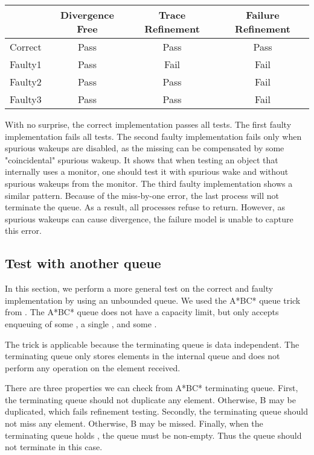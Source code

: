 \documentclass[a4paper, 12pt]{article}
\begin{document}
\begin{tabular}{|c | c | c | c|}
    \hline
    & Divergence Free & Trace Refinement & Failure Refinement \\ \hline
    Correct & Pass & Pass & Pass \\ \hline
    Faulty1 & Pass & Fail & Fail \\ \hline
    Faulty2 & Pass & Pass & Fail \\ \hline
    Faulty3 & Pass & Pass & Fail \\ \hline
\end{tabular}
\newline

With no surprise, the correct implementation passes all tests. The first faulty implementation fails all tests. The second faulty implementation fails only when spurious wakeups are disabled, as the missing  can be compensated by some "coincidental" spurious wakeup. It shows that when testing an object that internally uses a monitor, one should test it with spurious wake and without spurious wakeups from the monitor. The third faulty implementation shows a similar pattern. Because of the miss-by-one error, the last process will not terminate the queue. As a result, all processes refuse to return. However, as spurious wakeups can cause divergence, the failure model is unable to capture this error. 

\subsection{Test with another queue}
In this section, we perform a more general test on the correct and faulty implementation by using an unbounded queue. We used the A*BC* queue trick from \cite{ABC}. The A*BC* queue does not have a capacity limit, but only accepts enqueuing of some , a single , and some . 

The trick is applicable because the terminating queue is data independent. The terminating queue only stores elements in the internal queue and does not perform any operation on the element received. 

There are three properties we can check from A*BC* terminating queue. First, the terminating queue should not duplicate any element. Otherwise, B may be duplicated, which fails refinement testing. Secondly, the terminating queue should not miss any element. Otherwise, B may be missed. Finally, when the terminating queue holds , the queue must be non-empty. Thus the queue should not terminate in this case.
\end{document}
